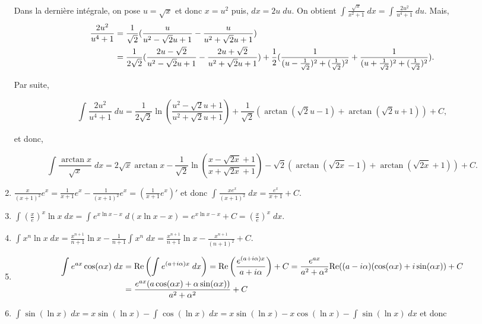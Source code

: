 \documentclass[11pt,a4paper]{article}
\newcommand{\Arctan}{\mathop{\mathrm{arctan}}\nolimits}
\begin{document}
\begin{enumerate}
Dans la dernière intégrale, on pose $u=\sqrt{x}$ et donc $x=u^2$ puis, $dx=2u\;du$. On obtient $\int_{}^{}\frac{\sqrt{x}}{x^2+1}\;dx=\int_{}^{}\frac{2u^2}{u^4+1}\;du$. Mais,
\begin{align*}\ensuremath
\frac{2u^2}{u^4+1}&=\frac{1}{\sqrt{2}}(\frac{u}{u^2-\sqrt{2}u+1}-\frac{u}{u^2+\sqrt{2}u+1})\\
 &=\frac{1}{2\sqrt{2}}(\frac{2u-\sqrt{2}}{u^2-\sqrt{2}u+1}-\frac{2u+\sqrt{2}}{u^2+\sqrt{2}u+1})+\frac{1}{2}(\frac{1}{(u-\frac{1}{\sqrt{2}})^2+(\frac{1}{\sqrt{2}})^2}+\frac{1}{(u+\frac{1}{\sqrt{2}})^2+(\frac{1}{\sqrt{2}})^2}).
\end{align*}

Par suite,

$$\int_{}^{}\frac{2u^2}{u^4+1}\;du=\frac{1}{2\sqrt{2}}\ln(\frac{u^2-\sqrt{2}u+1}{u^2+\sqrt{2}u+1})+\frac{1}{\sqrt{2}}
(\Arctan(\sqrt{2}u-1)+\Arctan(\sqrt{2}u+1))+C,$$

et donc,

$$\int_{}^{}\frac{\Arctan x}{\sqrt{x}}\;dx=2\sqrt{x}\Arctan x-\frac{1}{\sqrt{2}}\ln(\frac{x-\sqrt{2x}+1}{x+\sqrt{2x}+1})-\sqrt{2}(\Arctan(\sqrt{2x}-1)+\Arctan(\sqrt{2x}+1))+C.$$

\item  $\frac{x}{(x+1)^2}e^x=\frac{1}{x+1}e^x-\frac{1}{(x+1)^2}e^x=\left(\frac{1}{x+1}e^x\right)'$ et donc 
$\int_{}^{}\frac{xe^x}{(x+1)^2}\;dx=\frac{e^x}{x+1}+C$.

\item  $\int_{}^{}\left(\frac{x}{e}\right)^x\ln x\;dx=\int_{}^{}e^{x\ln x-x}\;d(x\ln x-x)=e^{x\ln x-x}+C=\left(\frac{x}{e}\right)^x\;dx$.

\item  $\int_{}^{}x^n\ln x\;dx=\frac{x^{n+1}}{n+1}\ln x-\frac{1}{n+1}\int_{}^{}x^n\;dx=\frac{x^{n+1}}{n+1}\ln x-\frac{x^{n+1}}{(n+1)^2}+C$.

\item  

\begin{align*}\ensuremath
\int_{}^{}e^{ax}\cos(\alpha x)\;dx&=\mbox{Re}\left(\int_{}^{}e^{(a+i\alpha)x}\;dx\right)=\mbox{Re}\left(\frac{e^{(a+i\alpha)x}}{a+i\alpha}\right)+C
=\frac{e^{ax}}{a^2+\alpha^2}\mbox{Re}((a-i\alpha)(\cos(\alpha x)+i\sin(\alpha x))+C\\
 &=\frac{e^{ax}(a\cos(\alpha x)+\alpha\sin(\alpha x))}{a^2+\alpha^2}+C
\end{align*}

\item $\int_{}^{}\sin(\ln x)\;dx=x\sin(\ln x)-\int_{}^{}\cos(\ln x)\;dx=x\sin(\ln x)-x\cos(\ln x)-\int_{}^{}\sin(\ln x)\;dx$ et donc 


\end{enumerate}
\end{document}
